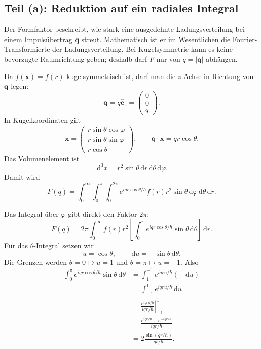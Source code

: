 \documentclass[11pt,a4paper]{scrartcl}
\newcommand{\abs}[1]{\left| #1 \right|}
\newcommand{\bracket}[1]{\left[ #1 \right]}
\newcommand{\dd}{\,\mathrm{d}}
\newcommand{\vect}[1]{\bm{#1}}
\newcommand{\unitvect}[1]{\hat{\bm{#1}}}
\begin{document}
\subsection{Teil (a): Reduktion auf ein radiales Integral}

\begin{definitionbox}[title=Physikalische Idee]
Der Formfaktor beschreibt, wie stark eine ausgedehnte Ladungsverteilung bei einem Impuls\"ubertrag $\vect{q}$ streut. Mathematisch ist er im Wesentlichen die Fourier-Transformierte der Ladungsverteilung. Bei Kugelsymmetrie kann es keine bevorzugte Raumrichtung geben; deshalb darf $F$ nur von $q=\abs{\vect{q}}$ abh\"angen.
\end{definitionbox}

\begin{calculationbox}[title=Koordinatenwahl und Skalarprodukt]
Da $f(\vect{x})=f(r)$ kugelsymmetrisch ist, darf man die $z$-Achse in Richtung von $\vect{q}$ legen:
\[
    \vect{q}=q\unitvect{e}_z=\begin{pmatrix}0\\0\\q\end{pmatrix}.
\]
In Kugelkoordinaten gilt
\[
    \vect{x}=\begin{pmatrix}
        r\sin\theta\cos\varphi\\
        r\sin\theta\sin\varphi\\
        r\cos\theta
    \end{pmatrix},
    \qquad
    \vect{q}\cdot\vect{x}=qr\cos\theta.
\]
Das Volumenelement ist
\[
    \dd^3x=r^2\sin\theta\dd r\dd\theta\dd\varphi.
\]
Damit wird
\[
    F(q)=\int_0^\infty\int_0^\pi\int_0^{2\pi}
    e^{iqr\cos\theta/\hbar}f(r)r^2\sin\theta
    \dd\varphi\dd\theta\dd r.
\]
\end{calculationbox}

\begin{calculationbox}[title=Winkelintegrale]
Das Integral \"uber $\varphi$ gibt direkt den Faktor $2\pi$:
\[
    F(q)=2\pi\int_0^\infty f(r)r^2
    \bracket{\int_0^\pi e^{iqr\cos\theta/\hbar}\sin\theta\dd\theta}\dd r.
\]
F\"ur das $\theta$-Integral setzen wir
\[
    u=\cos\theta,\qquad \dd u=-\sin\theta\dd\theta.
\]
Die Grenzen werden $\theta=0\mapsto u=1$ und $\theta=\pi\mapsto u=-1$. Also
\begin{align*}
    \int_0^\pi e^{iqr\cos\theta/\hbar}\sin\theta\dd\theta
    &=\int_{1}^{-1}e^{iqru/\hbar}(-\dd u)\\
    &=\int_{-1}^{1}e^{iqru/\hbar}\dd u\\
    &=\left.\frac{e^{iqru/\hbar}}{iqr/\hbar}\right|_{-1}^{1}\\
    &=\frac{e^{iqr/\hbar}-e^{-iqr/\hbar}}{iqr/\hbar}\\
    &=2\frac{\sin(qr/\hbar)}{qr/\hbar}.
\end{align*}
\end{calculationbox}
\end{document}
